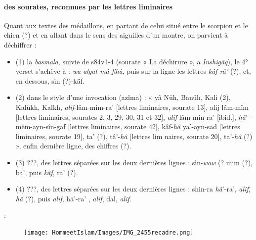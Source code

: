 \paragraph{des sourates, reconnues par les lettres liminaires}
Quant aux textes des médaillons, en partant de celui situé entre le scorpion et le chien (?) et en allant dans le sens des aiguilles d'un montre, on parvient à déchiffrer :
\begin{itemize}
    \item (1) la \textit{basmala}, suivie de s84v1-4 (sourate « La déchirure », a
\textit{Inshigãq}), le 4° verset s'achève à : \textit{wa algat má fihà}, puis sur la ligne
les lettres \textit{kâf-râ'} (?), et, en dessous, sìn (?)-käf.
\item (2) dans le style d'une invocation (azîma) : « yâ Nüh, Banüh, Kali
(2), Kalükh, Kalkh, \textit{alif}-lâm-mim-ra' [lettres liminaires, sourate 13], alij lâm-mîm [lettres liminaires, sourates 2, 3, 29, 30, 31 et 32], \textit{alif}-lâm-min
ra' [ibid.], \textit{hâ}'-mêm-ayn-sîn-gaf [lettres liminaires, sourate 42], kâf-\textit{hâ}
ya'-ayn-sad [lettres liminaires, sourate 19], ta' (?), tâ'-\textit{hâ} [lettres lim naires, sourate 20], ta'-\textit{hâ} (?) », enfin dernière ligne, des chiffres (?).
\item (3) ???, des lettres séparées sur les deux dernières lignes : sìn-\textit{waw} (?
mim (?), ba', puis \textit{kâf}, ra' (?).
\item (4) ???, des lettres séparées sur les deux dernières lignes : shin-ra
\textit{hâ}'-ra', \textit{alif}, \textit{hâ} (?), puis \textit{alif}, hā'-ra' , \textit{alif}, dal, \textit{alif}.
\end{itemize}:
\begin{figure}
    \centering
  
    \texttt{[image: HommeetIslam/Images/IMG\_2455recadre.png]}
    \label{fig:my_label}
\end{figure}



